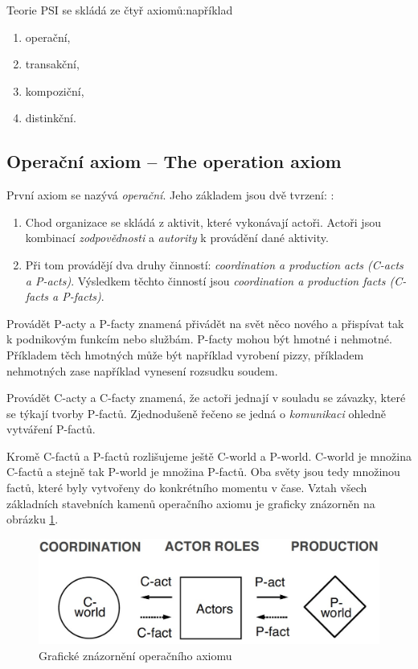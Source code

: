 Teorie PSI se skládá ze čtyř axiomů:například

\begin{enumerate}
\item operační,
\item transakční,
\item kompoziční,
\item distinkční.
\end{enumerate}

\subsection{Operační axiom – The operation axiom} \label{sec:operacni_axiom}
První axiom \ptheory se nazývá \textit{operační}. Jeho základem jsou dvě tvrzení: \cite{Dietz2006}:

\begin{enumerate}
\item Chod organizace se skládá z aktivit, které vykonávají actoři. Actoři jsou kombinací \textit{zodpovědnosti} a \textit{autority} k provádění dané aktivity.
\item Při tom provádějí dva druhy činností: \textit{coordination a production acts (C-acts a P-acts)}. Výsledkem těchto činností jsou \textit{coordination a production facts (C-facts a P-facts)}.
\end{enumerate}

Provádět P-acty a P-facty znamená přivádět na svět něco nového a přispívat tak k podnikovým funkcím nebo službám. P-facty mohou být hmotné i nehmotné. Příkladem těch hmotných může být například vyrobení pizzy, příkladem nehmotných zase například vynesení rozsudku soudem.

Provádět C-acty a C-facty znamená, že actoři jednají v souladu se závazky, které se týkají tvorby P-factů. Zjednodušeně řečeno se jedná o \textit{komunikaci} ohledně vytváření P-factů.

Kromě C-factů a P-factů rozlišujeme ještě C-world a P-world. C-world je množina C-factů a stejně tak P-world je množina P-factů. Oba světy jsou tedy množinou factů, které byly vytvořeny do konkrétního momentu v čase. Vztah všech základních stavebních kamenů operačního axiomu je graficky znázorněn na obrázku \ref{fig:operation_axiom}.

\begin{center}
\begin{figure}[H]
\centerline{\includegraphics[scale=0.3]{obrazky/operation-axiom}}
\caption{Grafické znázornění operačního axiomu \cite{Dietz2006}}
\label{fig:operation_axiom}
\end{figure}
\end{center}


